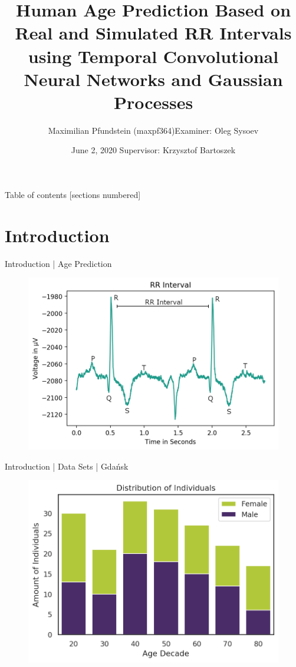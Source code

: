 \documentclass{beamer}
\title{Human Age Prediction Based on Real and Simulated RR Intervals using Temporal Convolutional Neural Networks and Gaussian Processes}
\date{June 2, 2020 \hfill Supervisor: Krzysztof Bartoszek}
\author{Maximilian Pfundstein (maxpf364)\hfill Examiner: Oleg Sysoev}
\institute{Linköpings University}
\begin{document}
    \maketitle
    
    \begin{frame}{Table of contents}
      [sections numbered]
      \tableofcontents%
    \end{frame}
    
    \section{Introduction}
    \begin{frame}{Introduction | Age Prediction}
        \begin{figure}[hbt]
        	\center
        	\includegraphics[width=1.0\textwidth]{img/rr-interval.png}
        	\label{fig:rr}
        \end{figure}
    \end{frame}
    
    \begin{frame}{Introduction | Data Sets | Gdańsk}
        \begin{figure}[hbt]
        	\center
        	\includegraphics[width=1.0\textwidth]{img/gdansk-distribution-subjects.png}
        	\label{fig:dist_gdansk}
        \end{figure}
    \end{frame}
    
\end{document}
